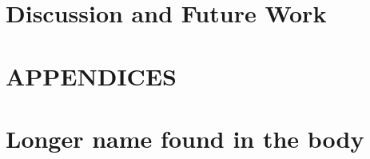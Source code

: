 \documentclass[letterpaper,12pt,titlepage,oneside,final]{book}
\let\origdoublepage\cleardoublepage
\newcommand{\clearemptydoublepage}{%
  \clearpage{\pagestyle{empty}\origdoublepage}}
\let\cleardoublepage\clearemptydoublepage
\begin{document}
\chapter{Discussion and Future Work} \label{chap:discussion}


\appendix

\chapter*{APPENDICES}
\chapter[Name in Contents]{Longer name found in the body}
\label{AppendixA}




\cleardoublepage %
\renewcommand*{\bibname}{References}




\nocite{*}
\end{document}
